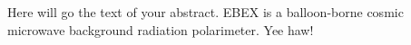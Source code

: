 
Here will go the text of your abstract. EBEX is a balloon-borne cosmic microwave background radiation polarimeter. Yee haw!

